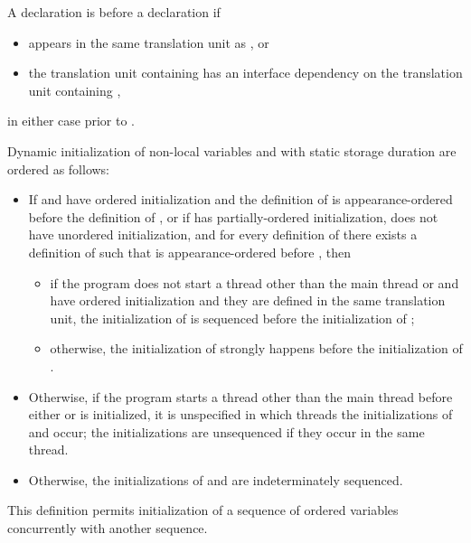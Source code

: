 \pnum
A declaration  is
 before a declaration  if
\begin{itemize}
\item {} appears in the same translation unit as , or
\item the translation unit containing 
has an interface dependency on the translation unit containing ,
\end{itemize}
in either case prior to .

\pnum
Dynamic initialization of non-local variables  and 
with static storage duration are ordered as follows:
\begin{itemize}
\item
If  and  have ordered initialization and
the definition of 
is appearance-ordered before the definition of , or
if  has partially-ordered initialization,
 does not have unordered initialization, and
for every definition  of 
there exists a definition  of 
such that  is appearance-ordered before , then
\begin{itemize}
\item
if the program does not start a thread
other than the main thread
or  and  have ordered initialization and
they are defined in the same translation unit,
the initialization of 
is sequenced before
the initialization of ;
\item
otherwise,
the initialization of 
strongly happens before
the initialization of .
\end{itemize}

\item
Otherwise, if the program starts a thread
other than the main thread
before either  or  is initialized,
it is unspecified in which threads
the initializations of  and  occur;
the initializations are unsequenced if they occur in the same thread.

\item
Otherwise, the initializations of  and  are indeterminately sequenced.
\end{itemize}
\begin{note}
This definition permits initialization of a sequence of
ordered variables concurrently with another sequence.
\end{note}


